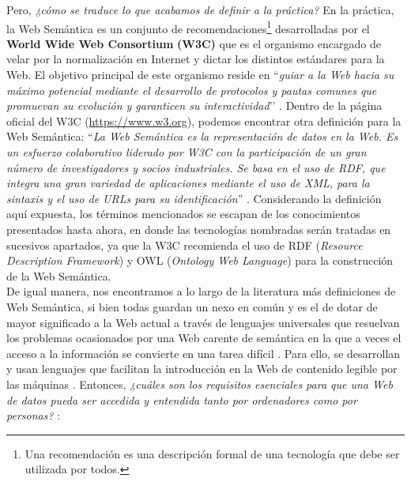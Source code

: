 Pero, \textit{¿cómo se traduce lo que acabamos de definir a la práctica?} En la práctica, la Web Semántica es un conjunto de recomendaciones\footnote{Una recomendación es una descripción formal de una tecnología que debe ser utilizada por todos.} desarrolladas por el \textbf{World Wide Web Consortium}\textbf{ (W3C) }que es el organismo encargado de velar por la normalización en Internet y dictar los distintos estándares para la Web. El objetivo principal de este organismo reside en ``\textit{guiar a la Web hacia su máximo potencial mediante el desarrollo de protocolos y pautas comunes que promuevan su evolución y garanticen su interactividad}’’ \cite{coursera, web-semantica-w3c}. Dentro de la página oficial del W3C (\url{https://www.w3.org}), podemos encontrar otra definición para la Web Semántica: ``\textit{La Web Semántica es la representación de datos en la Web. Es un esfuerzo colaborativo liderado por W3C con la participación de un gran número de investigadores y socios industriales. Se basa en el uso de RDF, que integra una gran variedad de aplicaciones mediante el uso de XML, para la sintaxis y el uso de URLs para su identificación}'' \cite{semantica-web}. Considerando la definición aquí expuesta, los términos mencionados se escapan de los conocimientos presentados hasta ahora, en donde las tecnologías nombradas serán tratadas en sucesivos apartados, ya que la W3C recomienda el uso de RDF (\textit{Resource Description Framework}) y OWL (\textit{Ontology Web Language}) para la construcción de la Web Semántica.\\

De igual manera, nos encontramos a lo largo de la literatura más definiciones de Web Semántica, si bien todas guardan un nexo en común y es el de dotar de mayor significado a la Web actual a través de lenguajes universales que resuelvan los problemas ocasionados por una Web carente de semántica en la que a veces el acceso a la información se convierte en una tarea difícil \cite{introduccion}. Para ello, se desarrollan y usan lenguajes que facilitan la introducción en la Web de contenido legible por las máquinas \cite{tesis}. Entonces, \textit{¿cuáles son los requisitos esenciales para que una Web de datos pueda ser accedida y entendida tanto por ordenadores como por personas?} \cite{coursera}:

